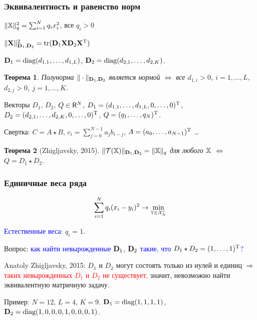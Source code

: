 \documentclass[unicode, notheorems]{beamer}
\newtheorem{theorem}{Теорема}
\begin{document}
\begin{frame}
	\frametitle{Эквивалентность и равенство норм}
    $\|\mathbb{X}\|_q^2 = \sum_{i = 1}^N q_i x_i^2$, все $q_i > 0$
    
    $\|\mathbf{X}\|^2_{\mathbf{D}_1, \mathbf{D}_2} = \text{tr}(\mathbf{D}_1 \mathbf{X} \mathbf{D}_2 \mathbf{X}^{\mathrm{T}})$
    
    $\mathbf{D}_1 = \text{diag}(d_{1, 1}, \ldots, d_{1, L})$, $\mathbf{D}_2 = \text{diag}(d_{2, 1}, \ldots, d_{2, K})$.
	
	\begin{theorem}
		Полунорма $\|\cdot\|_{\mathbf{D}_1, \mathbf{D}_2}$ является нормой $\Leftrightarrow$ все $d_{1, i} > 0$, $i = 1, \ldots, L$, $d_{2, j} > 0$, $j = 1, \ldots, K$.
	\end{theorem}
	\vspace{0.2cm}
	Векторы $D_1$, $D_2$, $Q \in \mathsf{R}^N$, $D_1 = (d_{1, 1}, \ldots, d_{1, L}, 0, \ldots, 0)^{\mathrm{T}}$, $D_2 = (d_{2, 1}, \ldots, d_{2, K}, 0, \ldots, 0)^{\mathrm{T}}$, $Q = (q_1, \ldots, q_N)^{\mathrm{T}}$.
	
	Свертка: $C = A \star B$, $c_{i} = \sum_{j=0}^{N-1} a_{j} b_{i-j}$, $A = (a_0, \ldots, a_{N-1})^{\mathrm{T}}$ \ldots
	\begin{theorem}[Zhigljavsky, 2015]
		$\|\mathcal{T}(\mathbb{X})\|_{\mathbf{D}_1, \mathbf{D}_2} = \|\mathbb{X}\|_q$ для любого $\mathbb{X}$ $\Leftrightarrow$ $Q = D_1 \star D_2$.
	\end{theorem}
\end{frame}

\begin{frame}
	\frametitle{Единичные веса ряда}
	\vspace{-0.3cm}
	\begin{equation*}
	\sum \limits_{i=1}^N q_i(x_i - y_i)^2 \to \min_{\mathbb{Y} \in \mathcal{X}_N^r}
	\end{equation*}
	
    \textcolor{blue}{Естественные веса:} $q_i = 1$.
	
	\vspace{0.3cm}
	
	Вопрос: \textcolor{blue}{как найти невырожденные $\mathbf{D}_1$, $\mathbf{D}_2$ такие, что $D_1 \star D_2 = (1, \ldots, 1)^{\mathrm{T}}$?}
	
	Anatoly Zhigljavsky, 2015: $D_1$ и $D_2$ могут состоять только из нулей и единиц $\Rightarrow$ \textcolor{red}{таких невырожденных $D_1$ и $D_2$ не существует,} значит, невозможно найти эквивалентную матричную задачу.
	
	\vspace{0.4cm}
	Пример: $N = 12$, $L = 4$, $K = 9$. $\mathbf{D}_1 = \text{diag}(1, 1, 1, 1)$, 
	$\mathbf{D}_2 = \text{diag}(1, 0, 0, 0, 1, 0, 0, 0, 1)$.
\end{frame}
\end{document}
